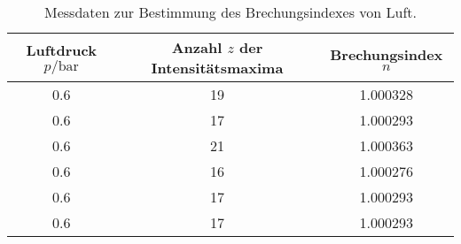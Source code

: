 \begin{table}[H]
  \centering
  \caption{Messdaten zur Bestimmung des Brechungsindexes von Luft.}
  \label{tab:Brechungsindex}
  \begin{tabular}{S[table-format=1.1] S[table-format=2.0] S[table-format=1.6]}
  \toprule
  {Luftdruck $ p / \si{\bar}$} & {Anzahl $z$ der Intensitätsmaxima} & {Brechungsindex $n$}\\
   & 19 & 1.000328 \\
    0.6 & 17 & 1.000293 \\
    0.6 & 21 & 1.000363 \\
    0.6 & 16 & 1.000276 \\
    0.6 & 17 & 1.000293 \\
    0.6 & 17 & 1.000293 \\
  \bottomrule
  \end{tabular}
\end{table}


